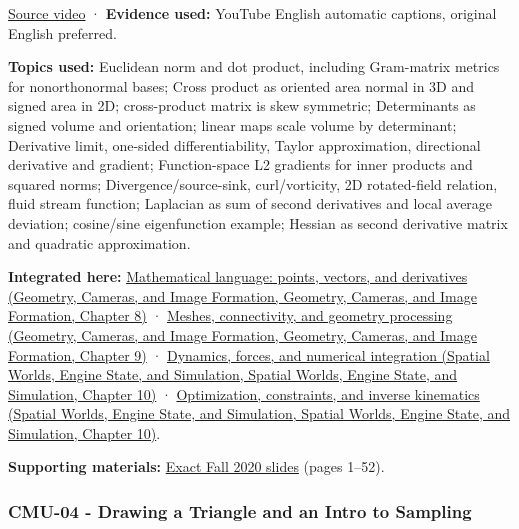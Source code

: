 \href{https://www.youtube.com/watch?v=O7Bec2uX3ZQ}{Source video} · \textbf{Evidence used:} YouTube English automatic captions, original English preferred.

\textbf{Topics used:} Euclidean norm and dot product, including Gram-matrix metrics for nonorthonormal bases; Cross product as oriented area normal in 3D and signed area in 2D; cross-product matrix is skew symmetric; Determinants as signed volume and orientation; linear maps scale volume by determinant; Derivative limit, one-sided differentiability, Taylor approximation, directional derivative and gradient; Function-space L2 gradients for inner products and squared norms; Divergence/source-sink, curl/vorticity, 2D rotated-field relation, fluid stream function; Laplacian as sum of second derivatives and local average deviation; cosine/sine eigenfunction example; Hessian as second derivative matrix and quadratic approximation.

\textbf{Integrated here:} \href{../03-Geometry-Cameras-and-Image-Formation/main.pdf\#nameddest=03-visual-computing-i-ch001-mathematical-language-points-vectors-and-derivatives}{Mathematical language: points, vectors, and derivatives (Geometry, Cameras, and Image Formation, Geometry, Cameras, and Image Formation, Chapter 8)} · \href{../03-Geometry-Cameras-and-Image-Formation/main.pdf\#nameddest=03-visual-computing-i-ch002-meshes-connectivity-and-geometry-processing}{Meshes, connectivity, and geometry processing (Geometry, Cameras, and Image Formation, Geometry, Cameras, and Image Formation, Chapter 9)} · \href{../05-Spatial-Worlds-Engine-State-and-Simulation/main.pdf\#nameddest=04-visual-computing-ii-ch029-dynamics-forces-and-numerical-integration}{Dynamics, forces, and numerical integration (Spatial Worlds, Engine State, and Simulation, Spatial Worlds, Engine State, and Simulation, Chapter 10)} · \href{../05-Spatial-Worlds-Engine-State-and-Simulation/main.pdf\#nameddest=04-visual-computing-ii-ch029-optimization-constraints-and-inverse-kinematics}{Optimization, constraints, and inverse kinematics (Spatial Worlds, Engine State, and Simulation, Spatial Worlds, Engine State, and Simulation, Chapter 10)}.

\textbf{Supporting materials:} \href{https://15462.courses.cs.cmu.edu/fall2020content/lectures/03_vectorcalc/03_vectorcalc_slides.pdf}{Exact Fall 2020 slides} (pages 1--52).

\subsubsection{CMU-04 - Drawing a Triangle and an Intro to Sampling}\label{04-visual-computing-ii-ch036-cmu-04---drawing-a-triangle-and-an-intro-to-sampling}

